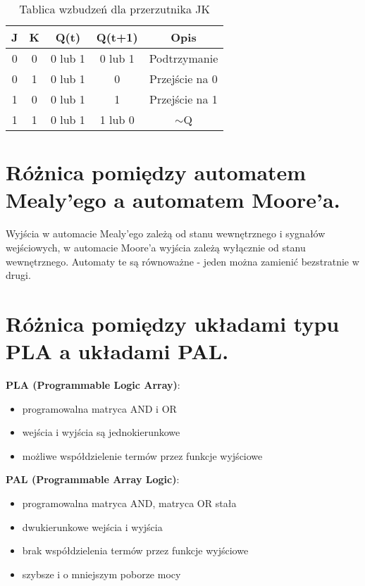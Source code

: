 \documentclass[12pt,a4paper]{article}
\begin{document}
	\begin{table}[!h]
		\centering
		\begin{tabular}{|c|c|c|c|c|}
			\hline
			\textbf{J} & \textbf{K} & \textbf{Q(t)} & \textbf{Q(t+1)} & \textbf{Opis}  \\ \hline
			0          & 0          & 0 lub 1       & 0 lub 1         & Podtrzymanie   \\ \hline
			0          & 1          & 0 lub 1       & 0               & Przejście na 0 \\ \hline
			1          & 0          & 0 lub 1       & 1               & Przejście na 1 \\ \hline
			1          & 1          & 0 lub 1       & 1 lub 0         & $\sim$Q        \\ \hline
		\end{tabular}
		\caption{Tablica wzbudzeń dla przerzutnika JK}
	\end{table}

	\section{Różnica pomiędzy automatem Mealy'ego a automatem Moore'a.}
	Wyjścia w automacie Mealy'ego zależą od stanu wewnętrznego i sygnałów wejściowych, w automacie Moore'a wyjścia zależą wyłącznie od stanu wewnętrznego. Automaty te są równoważne - jeden można zamienić bezstratnie w drugi.

	\section{Różnica pomiędzy układami typu PLA a układami PAL.}
	\textbf{PLA (Programmable Logic Array)}:
	\begin{itemize}
		\item programowalna matryca AND i OR
		\item wejścia i wyjścia są jednokierunkowe
		\item możliwe współdzielenie termów przez funkcje wyjściowe
	\end{itemize}
	
\textbf{PAL (Programmable Array Logic)}:
	\begin{itemize}
		\item programowalna matryca AND, matryca OR stała
		\item dwukierunkowe wejścia i wyjścia
		\item brak współdzielenia termów przez funkcje wyjściowe
		\item szybsze i o mniejszym poborze mocy
	\end{itemize}
\end{document}
